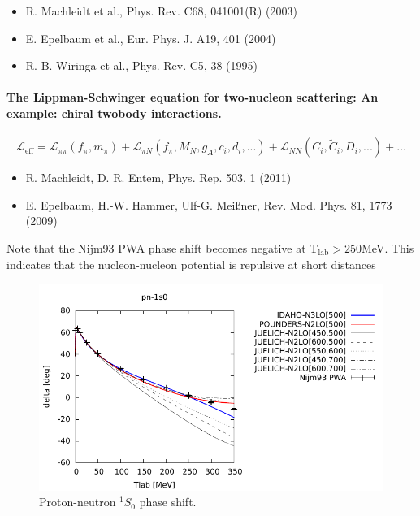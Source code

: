 \documentclass[%
oneside,                 %
final,                   %
10pt]{article}
\begin{document}
\noindent
\begin{itemize}
\item R. Machleidt et al., Phys. Rev. C68, 041001(R) (2003)

\item E. Epelbaum et al., Eur. Phys. J. A19, 401 (2004)

\item R. B. Wiringa et al., Phys. Rev. C5, 38 (1995)
\end{itemize}

\noindent
\paragraph{The Lippman-Schwinger equation for two-nucleon scattering: An example: chiral twobody interactions.}
\[
\mathcal{L_{\mathrm{eff}}} = \mathcal{L}_{\pi \pi}(f_\pi,m_{\pi}) + \mathcal{L}_{\pi N}(f_{\pi},M_{N},g_A,c_i,d_i,...) + \mathcal{L}_{NN}(C_{i},\tilde{C}_{i},D_{i},...) + \ldots
\]
\begin{itemize}
\item R. Machleidt, D. R. Entem, Phys. Rep. 503, 1 (2011)

\item E. Epelbaum, H.-W. Hammer, Ulf-G. Mei\ss{}ner, Rev. Mod. Phys. 81, 1773 (2009)
\end{itemize}

\noindent
Note that the Nijm93 PWA phase shift becomes negative at T$_{\mathrm{lab}}> 250$MeV. This indicates that the nucleon-nucleon potential is repulsive at short distances 

\begin{figure}[t]
  \centerline{\includegraphics[width=0.7\linewidth]{fig-forces/phase-pn-1s0_IDAHO_JUELICH.pdf}}
  \caption{
  Proton-neutron $^1S_0$ phase shift.
  }
\end{figure}
\end{document}

